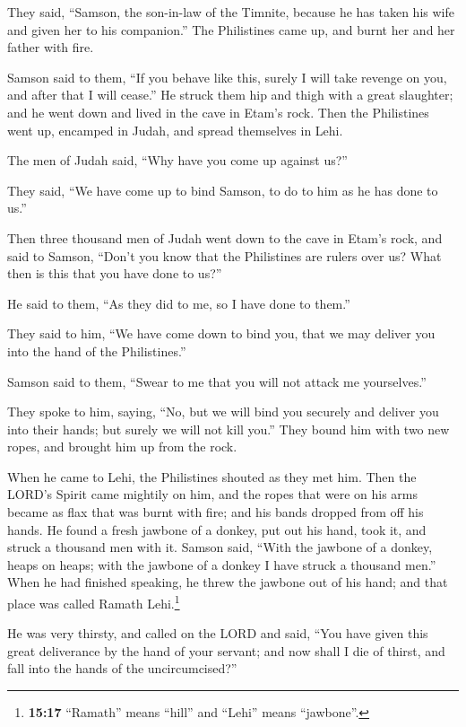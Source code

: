 They said, ``Samson, the son-in-law of the Timnite, because he has taken
his wife and given her to his companion.'' The Philistines came up, and
burnt her and her father with fire.

 Samson said to them, ``If you behave like this, surely I
will take revenge on you, and after that I will cease.'' 
He struck them hip and thigh with a great slaughter; and he went down
and lived in the cave in Etam's rock.  Then the
Philistines went up, encamped in Judah, and spread themselves in Lehi.

 The men of Judah said, ``Why have you come up against
us?''

They said, ``We have come up to bind Samson, to do to him as he has done
to us.''

 Then three thousand men of Judah went down to the cave
in Etam's rock, and said to Samson, ``Don't you know that the
Philistines are rulers over us? What then is this that you have done to
us?''

He said to them, ``As they did to me, so I have done to them.''

 They said to him, ``We have come down to bind you, that
we may deliver you into the hand of the Philistines.''

Samson said to them, ``Swear to me that you will not attack me
yourselves.''

 They spoke to him, saying, ``No, but we will bind you
securely and deliver you into their hands; but surely we will not kill
you.'' They bound him with two new ropes, and brought him up from the
rock.

 When he came to Lehi, the Philistines shouted as they
met him. Then the LORD's Spirit came mightily on him, and the ropes that
were on his arms became as flax that was burnt with fire; and his bands
dropped from off his hands.  He found a fresh jawbone of
a donkey, put out his hand, took it, and struck a thousand men with it.
 Samson said, ``With the jawbone of a donkey, heaps on
heaps; with the jawbone of a donkey I have struck a thousand men.''
 When he had finished speaking, he threw the jawbone out
of his hand; and that place was called Ramath Lehi.\footnote{\textbf{15:17}
  ``Ramath'' means ``hill'' and ``Lehi'' means ``jawbone''.}

 He was very thirsty, and called on the LORD and said,
``You have given this great deliverance by the hand of your servant; and
now shall I die of thirst, and fall into the hands of the
uncircumcised?''

